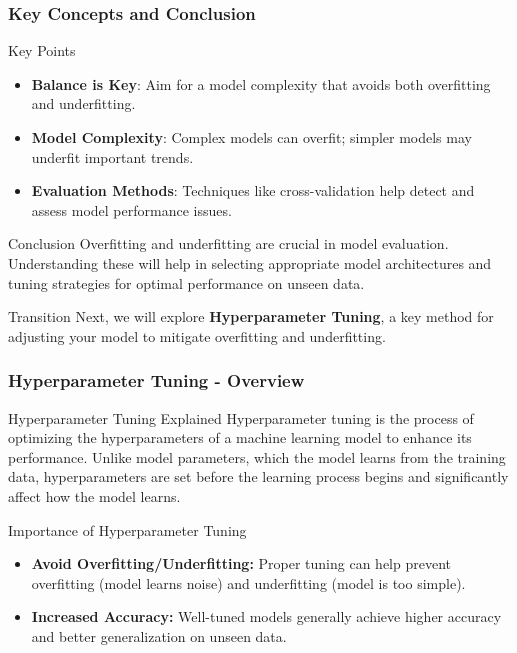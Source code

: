 \documentclass[aspectratio=169]{beamer}
\begin{document}
\begin{frame}[fragile]
    \frametitle{Key Concepts and Conclusion}
    \begin{block}{Key Points}
        \begin{itemize}
            \item \textbf{Balance is Key}: Aim for a model complexity that avoids both overfitting and underfitting.
            \item \textbf{Model Complexity}: Complex models can overfit; simpler models may underfit important trends.
            \item \textbf{Evaluation Methods}: Techniques like cross-validation help detect and assess model performance issues.
        \end{itemize}
    \end{block}

    \begin{block}{Conclusion}
        Overfitting and underfitting are crucial in model evaluation. Understanding these will help in selecting appropriate model architectures and tuning strategies for optimal performance on unseen data.
    \end{block}

    \begin{block}{Transition}
        Next, we will explore \textbf{Hyperparameter Tuning}, a key method for adjusting your model to mitigate overfitting and underfitting.
    \end{block}
\end{frame}

\begin{frame}[fragile]
    \frametitle{Hyperparameter Tuning - Overview}
    \begin{block}{Hyperparameter Tuning Explained}
        Hyperparameter tuning is the process of optimizing the hyperparameters of a machine learning model to enhance its performance. Unlike model parameters, which the model learns from the training data, hyperparameters are set before the learning process begins and significantly affect how the model learns.
    \end{block}

    \begin{block}{Importance of Hyperparameter Tuning}
        \begin{itemize}
            \item \textbf{Avoid Overfitting/Underfitting:} Proper tuning can help prevent overfitting (model learns noise) and underfitting (model is too simple).
            \item \textbf{Increased Accuracy:} Well-tuned models generally achieve higher accuracy and better generalization on unseen data.
        \end{itemize}
    \end{block}
\end{frame}
\end{document}
